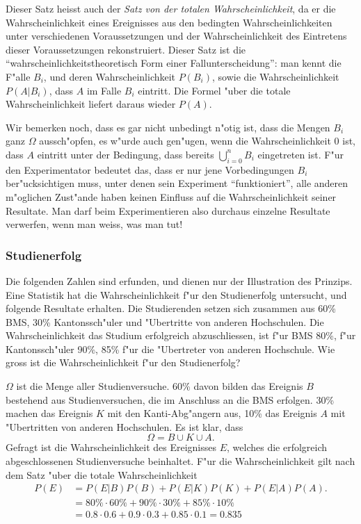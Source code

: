 Dieser Satz heisst auch der {\em Satz von der totalen Wahrscheinlichkeit},
da er die Wahrscheinlichkeit eines Ereignisses aus den bedingten
Wahrscheinlichkeiten unter verschiedenen Voraussetzungen und der
Wahrscheinlichkeit des Eintretens dieser Voraussetzungen rekonstruiert.
Dieser Satz ist die ``wahrscheinlichkeitstheoretisch Form einer
Fallunterscheidung'': man kennt die F"alle $B_i$, und deren Wahrscheinlichkeit
$P(B_i)$, sowie die Wahrscheinlichkeit $P(A|B_i)$, dass $A$ im Falle 
$B_i$ eintritt.
Die Formel "uber die totale Wahrscheinlichkeit
liefert daraus wieder $P(A)$.

Wir bemerken noch, dass es gar nicht unbedingt n"otig ist, dass die Mengen
$B_i$ ganz $\Omega$ aussch"opfen, es w"urde auch
gen"ugen, wenn die Wahrscheinlichkeit $0$ ist, dass $A$ eintritt
unter der Bedingung,
dass bereits $\bigcup_{i=0}^{n}B_i$ eingetreten ist.
F"ur den
Experimentator bedeutet das, dass er nur jene Vorbedingungen $B_i$
ber"ucksichtigen muss, unter denen sein Experiment ``funktioniert'',
alle anderen m"oglichen Zust"ande haben keinen Einfluss auf
die Wahrscheinlichkeit seiner Resultate.
Man darf beim Experimentieren
also durchaus einzelne Resultate verwerfen, wenn man weiss, was man tut!

\subsubsection{Studienerfolg}
Die folgenden Zahlen sind erfunden, und dienen nur der Illustration
des Prinzips.
Eine Statistik hat die Wahrscheinlichkeit f"ur den
Studienerfolg untersucht, und folgende Resultate erhalten.
Die Studierenden setzen sich zusammen aus 60\% BMS, 30\% Kantonssch"uler
und "Ubertritte von anderen Hochschulen.
Die Wahrscheinlichkeit
das Studium erfolgreich abzuschliessen, ist f"ur BMS 80\%,
f"ur Kantonssch"uler 90\%, 85\% f"ur die "Ubertreter von anderen
Hochschule.
Wie gross ist die Wahrscheinlichkeit f"ur den Studienerfolg?

$\Omega$ ist die Menge aller Studienversuche.
60\% davon bilden das
Ereignis $B$ bestehend aus Studienversuchen, die im Anschluss an die BMS
erfolgen.
30\% machen das Ereignis $K$ mit den Kanti-Abg"angern aus,
10\% das Ereignis $A$ mit "Ubertritten von anderen Hochschulen.
Es ist klar, dass 
\[
\Omega = B \cup K\cup A.
\]
Gefragt ist die Wahrscheinlichkeit des Ereignisses $E$, welches
die erfolgreich abgeschlossenen Studienversuche beinhaltet.
F"ur die Wahrscheinlichkeit gilt nach dem Satz "uber die totale
Wahrscheinlichkeit
\begin{align*}
P(E)&=P(E|B)P(B)+P(E|K)P(K)+P(E|A)P(A).
\\
    &= 80\%\cdot 60\%
     + 90\%\cdot 30\%
     + 85\%\cdot 10\%
\\
&=0.8\cdot 0.6 + 0.9 \cdot 0.3 + 0.85 \cdot 0.1 = 0.835
\end{align*}


